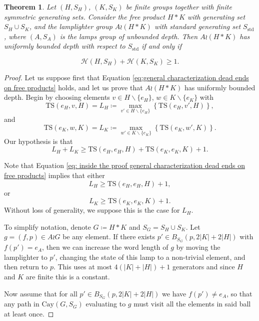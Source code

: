 \documentclass[reqno,oneside]{amsart}
\newcommand{\cay}[2]{\mathrm{Cay}(#1,#2)}
\newcommand{\std}{S_{\mathrm{std}}}
\newcommand{\TS}[3]{\mathrm{TS}\left(#1,#2,#3\right)}
\theoremstyle{plain}
\newtheorem{thm}{Theorem}[section] %
\theoremstyle{definition}
\begin{document}
\begin{thm}\label{thm: general dead ends on free products} Let $(H,S_H)$, $(K,S_K)$ be finite groups together with finite symmetric generating sets. Consider the free product $H*K$ with generating set $S_H\cup S_K$, and the lamplighter group $A\wr (H*K)$ with standard generating set $\std$, where $(A,S_A)$ is the lamps group of unbounded depth. Then $A\wr (H*K)$ has uniformly bounded depth with respect to $\std$ if and only if
 
	\begin{equation}\label{eq:general characterization dead ends on free products}
	\mathscr{H}(H,S_H)+\mathscr{H}(K,S_K)\ge 1.
	\end{equation} 
	
\end{thm}
\begin{proof}
	Let us suppose first that Equation \eqref{eq:general characterization dead ends on free products} holds, and let us prove that $A\wr (H*K)$ has uniformly bounded depth. Begin by choosing elements $v\in H\backslash\{e_H\}$, $w\in K\backslash\{e_K\}$ with
	$$
	\TS{e_H}{v}{H}=L_H\coloneqq  \max_{v'\in H\backslash\{e_H\}}\left\{\TS{e_H}{v'}{H}\right\},$$ and $$\TS{e_K}{w}{K}=L_K\coloneqq  \max_{w'\in K\backslash\{e_K\}}\left\{\TS{e_K}{w'}{K}\right\}.
	$$
	Our hypothesis is that 
	\begin{equation}\label{eq: inside the proof general characterization dead ends on free products}
	L_H+L_K\ge \TS{e_H}{e_H}{H}+\TS{e_K}{e_K}{K}+1.
	\end{equation}
	
	Note that Equation \eqref{eq: inside the proof general characterization dead ends on free products} implies that either $$L_H\ge \TS{e_H}{e_H}{H}+1, $$ or $$L_K\ge \TS{e_K}{e_K}{K}+1.$$ Without loss of generality, we suppose this is the case for $L_H$.
	
	
	To simplify notation, denote $G\coloneqq H*K$ and $S_G=S_H\cup S_K$. Let $g=(f,p)\in A\wr G$ be any element. If there exists $p'\in B_{S_G}(p,2|K|+2|H|)$ with $f(p')=e_A$, then we can increase the word length of $g$ by moving the lamplighter to $p'$, changing the state of this lamp to a non-trivial element, and then return to $p$. This uses at most $4(|K|+|H|)+1$ generators and since $H$ and $K$ are finite this is a constant.
	
	Now assume that for all $p'\in B_{S_G}(p,2|K|+2|H|)$ we have $f(p')\neq e_A$, so that any path in $\cay{G}{S_G}$ evaluating to $g$ must visit all the elements in said ball at least once.
	

\end{proof}
\end{document}
